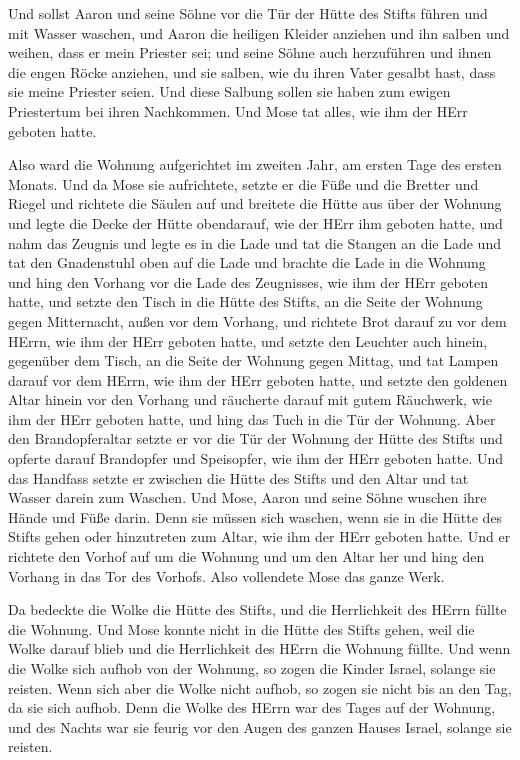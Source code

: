  Und sollst Aaron und seine Söhne vor die Tür der Hütte des
Stifts führen und mit Wasser waschen,  und Aaron die
heiligen Kleider anziehen und ihn salben und weihen, dass er mein
Priester sei;  und seine Söhne auch herzuführen und ihnen
die engen Röcke anziehen,  und sie salben, wie du ihren
Vater gesalbt hast, dass sie meine Priester seien. Und diese Salbung
sollen sie haben zum ewigen Priestertum bei ihren Nachkommen.
 Und Mose tat alles, wie ihm der HErr geboten hatte.

 Also ward die Wohnung aufgerichtet im zweiten Jahr, am
ersten Tage des ersten Monats.  Und da Mose sie
aufrichtete, setzte er die Füße und die Bretter und Riegel und richtete
die Säulen auf  und breitete die Hütte aus über der Wohnung
und legte die Decke der Hütte obendarauf, wie der HErr ihm geboten
hatte,  und nahm das Zeugnis und legte es in die Lade und
tat die Stangen an die Lade und tat den Gnadenstuhl oben auf die Lade
 und brachte die Lade in die Wohnung und hing den Vorhang
vor die Lade des Zeugnisses, wie ihm der HErr geboten hatte,
 und setzte den Tisch in die Hütte des Stifts, an die Seite
der Wohnung gegen Mitternacht, außen vor dem Vorhang,  und
richtete Brot darauf zu vor dem HErrn, wie ihm der HErr geboten hatte,
 und setzte den Leuchter auch hinein, gegenüber dem Tisch,
an die Seite der Wohnung gegen Mittag,  und tat Lampen
darauf vor dem HErrn, wie ihm der HErr geboten hatte,  und
setzte den goldenen Altar hinein vor den Vorhang  und
räucherte darauf mit gutem Räuchwerk, wie ihm der HErr geboten hatte,
 und hing das Tuch in die Tür der Wohnung. 
Aber den Brandopferaltar setzte er vor die Tür der Wohnung der Hütte des
Stifts und opferte darauf Brandopfer und Speisopfer, wie ihm der HErr
geboten hatte.  Und das Handfass setzte er zwischen die
Hütte des Stifts und den Altar und tat Wasser darein zum Waschen.
 Und Mose, Aaron und seine Söhne wuschen ihre Hände und
Füße darin.  Denn sie müssen sich waschen, wenn sie in die
Hütte des Stifts gehen oder hinzutreten zum Altar, wie ihm der HErr
geboten hatte.  Und er richtete den Vorhof auf um die
Wohnung und um den Altar her und hing den Vorhang in das Tor des
Vorhofs. Also vollendete Mose das ganze Werk.

 Da bedeckte die Wolke die Hütte des Stifts, und die
Herrlichkeit des HErrn füllte die Wohnung.  Und Mose konnte
nicht in die Hütte des Stifts gehen, weil die Wolke darauf blieb und die
Herrlichkeit des HErrn die Wohnung füllte.  Und wenn die
Wolke sich aufhob von der Wohnung, so zogen die Kinder Israel, solange
sie reisten.  Wenn sich aber die Wolke nicht aufhob, so
zogen sie nicht bis an den Tag, da sie sich aufhob.  Denn
die Wolke des HErrn war des Tages auf der Wohnung, und des Nachts war
sie feurig vor den Augen des ganzen Hauses Israel, solange sie reisten.
